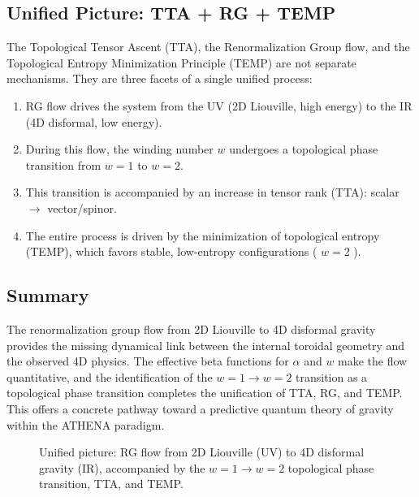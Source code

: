 \documentclass[11pt,a4paper]{article}
\begin{document}
\subsection{Unified Picture: TTA + RG + TEMP}
The Topological Tensor Ascent (TTA), the Renormalization Group flow, and the Topological Entropy Minimization Principle (TEMP) are not separate mechanisms. They are three facets of a single unified process:
\begin{enumerate}
\item RG flow drives the system from the UV (2D Liouville, high energy) to the IR (4D disformal, low energy).
\item During this flow, the winding number \(w\) undergoes a topological phase transition from \(w = 1\) to \(w = 2\).
\item This transition is accompanied by an increase in tensor rank (TTA): scalar \(\rightarrow\) vector/spinor.
\item The entire process is driven by the minimization of topological entropy (TEMP), which favors stable, low-entropy configurations ( \(w = 2\) ).
\end{enumerate}

\subsection{Summary}
The renormalization group flow from 2D Liouville to 4D disformal gravity provides the missing dynamical link between the internal toroidal geometry and the observed 4D physics. The effective beta functions for \(\alpha\) and \(w\) make the flow quantitative, and the identification of the \(w = 1 \to w = 2\) transition as a topological phase transition completes the unification of TTA, RG, and TEMP. This offers a concrete pathway toward a predictive quantum theory of gravity within the ATHENA paradigm.

\begin{figure}[H]
\centering
{}
\caption{Unified picture: RG flow from 2D Liouville (UV) to 4D disformal gravity (IR), accompanied by the \(w=1\to w=2\) topological phase transition, TTA, and TEMP.}
\end{figure}
\end{document}
